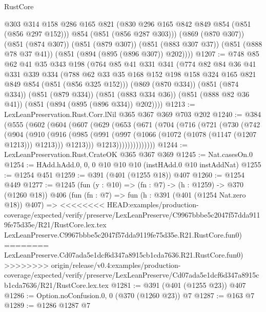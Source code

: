 \begin{lexlean}{RustCore}
\begin{coremodule}
{\begin{coremodule}
{{{{{          @303
          @314
          @158
          @286
          @165
          @821
          (@830 @296 @165 @842 @849 @854 (@851 (@856 @297 @152)))
          @854
          (@851 (@856 @287 @303)))
        (@869 (@870 @307))
        (@851 (@874 @307))
        (@851 (@879 @307))
        (@851 (@883 @307 @37))
        (@851 (@888 @78 @37 @41))
        (@851 (@894 (@895 (@896 @307)) @202))))
@1207 := @748
    @85
    @62
    @41
    @35
    @343
    @198
    (@764
      @85
      @41
      @331
      @341
      (@774
        @82
        @84
        @36
        @41
        @331
        @339
        @334
        (@788 @62 @33 @35 @168 @152 @198 @158 @324 @165 @821 @849 @854 (@851 (@856 @325 @152)))
        (@869 (@870 @334))
        (@851 (@874 @334))
        (@851 (@879 @334))
        (@851 (@883 @334 @36))
        (@851 (@888 @82 @36 @41))
        (@851 (@894 (@895 (@896 @334)) @202))))
@1213 := LexLeanPreservation.Rust.Corr.lNil @365 @367 @369 @703 @202
@1240 := @384
    (@555
      (@602
        (@604
          (@607
            (@629
              (@653
                (@671
                  (@704
                    (@716
                      (@721
                        (@730
                          (@742
                            (@904
                              (@910
                                (@916
                                  (@985
                                    (@991
                                      (@997 (@1066 (@1072 (@1078 (@1147 (@1207 @1213))) @1213)))
                                      @1213)))
                                @1213))))))))))))))
@1244 := LexLeanPreservation.Rust.CrateOK @365 @367 @369
@1245 := Nat.casesOn.{0}
@1254 := HAdd.hAdd.{0, 0, 0} @10 @10 @10 (instHAdd.{0} @10 instAddNat)
@1255 := @1254 @451
@1259 := @391 (@401 (@1255 @18)) @407
@1260 := @1254 @449
@1277 := @1245
    (fun (y : @10) => (fn : @7) -> (h : @1259) -> @370 (@1260 @18))
    @406
    (fun (fn : @7) =>
    fun (h : @391 (@401 (@1254 Nat.zero @18)) @407) =>
<<<<<<<< HEAD:examples/production-coverage/expected/verify/preserve/LexLeanPreserve/C9967bbbe5c2047f57dda9119fe75d35e/R21/RustCore.lex.tex
    LexLeanPreserve.C9967bbbe5c2047f57dda9119fe75d35e.R21.RustCore.fun0)
========
    LexLeanPreserve.Cd07ada5e1dcf6d347a8915cb1cda7636.R21.RustCore.fun0)
>>>>>>>> origin/release/v0.4:examples/production-coverage/expected/verify/preserve/LexLeanPreserve/Cd07ada5e1dcf6d347a8915cb1cda7636/R21/RustCore.lex.tex
@1281 := @391 (@401 (@1255 @23)) @407
@1286 := Option.noConfusion.{0, 0} (@370 (@1260 @23)) @7
@1287 := @163 @7
@1289 := @1286 @1287 @7
}}}}}
\end{coremodule}}
\end{coremodule}
\end{lexlean}
